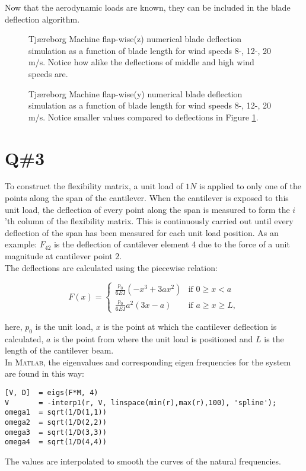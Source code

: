 Now that the aerodynamic loads are known, they can be included in the blade deflection algorithm. 

\setlength\figureheight{4.0cm}
\setlength\figurewidth{13cm}
\begin{figure}[H]
	\hspace*{-1.8cm}
	\centering
	
	\caption{\small{Tjæreborg Machine flap-wise(z) numerical blade deflection simulation as a function of blade length for wind speeds 8-, 12-, 20 m/s. Notice how alike the deflections of middle and high wind speeds are.}}
	\label{q2_defl_z}
\end{figure}

\setlength\figureheight{4.0cm}
\setlength\figurewidth{13cm}
\begin{figure}[H]
	\hspace*{-1.8cm}
	\centering
	
	\caption{\small{Tjæreborg Machine flap-wise(y) numerical blade deflection simulation as a function of blade length for wind speeds 8-, 12-, 20 m/s. Notice smaller values compared to deflections in Figure \ref{q2_defl_z}.}}
	\label{q2_defl_y}
\end{figure}

\section*{Q\#3}

To construct the flexibility matrix, a unit load of $1 \unit{N}$ is applied to only one of the points along the span of the cantilever. When the cantilever is exposed to this unit load, the deflection of every point along the span is measured to form the $i$'th column of the flexibility matrix. This is continuously carried out until every deflection of the span has been measured for each unit load position. As an example: $F_{42}$ is the deflection of cantilever element 4 due to the force of a unit magnitude at cantilever point 2. \\
The deflections are calculated using the piecewise relation:

\begin{equation}
F(x) = 
	\begin{cases}
		\frac{p_0}{6EI} (-x^3 + 3ax^2) 	& \text{if } 0 \geq x < a \\
		\frac{p_0}{6EI} a^2 (3x-a) 		& \text{if } a \geq x \geq L,
	\end{cases}
\end{equation}

here, $p_0$ is the unit load, $x$ is the point at which the cantilever deflection is calculated, $a$ is the point from where the unit load is positioned and $L$ is the length of the cantilever beam.\\
In \textsc{Matlab}, the eigenvalues and corresponding eigen frequencies for the system are found in this way:
\begin{lstlisting}
[V, D] 	= eigs(F*M, 4)
V 		= -interp1(r, V, linspace(min(r),max(r),100), 'spline');
omega1 	= sqrt(1/D(1,1))
omega2 	= sqrt(1/D(2,2))
omega3 	= sqrt(1/D(3,3))
omega4 	= sqrt(1/D(4,4))
\end{lstlisting}
The values are interpolated to smooth the curves of the natural frequencies.

